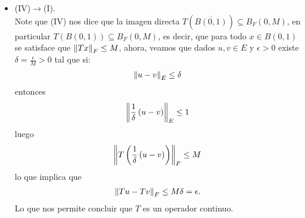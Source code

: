 \begin{homeworkProblem}
\begin{solution}
\begin{itemize}
      \item (IV)$\to$(I).\\
        Note que (IV) nos dice que la imagen directa $T\left( \overline{B(0,1)} \right)\subseteq B_{F}(0,M)$, en particular $T\left( B(0,1) \right)\subseteq B_{F}(0,M)$, es decir, que para todo $x\in B(0,1)$ se satisface que $\left\|Tx\right\|_{F}\leq M$, ahora, veamos que dados $u,v\in E$ y $\epsilon>0$ existe $\delta=\frac{\epsilon}{M}>0$ tal que si:
        \begin{align*}
          \left\|u-v\right\|_{E}\leq\delta
        \end{align*}
        entonces
        \begin{align*}
          \left\|\frac{1}{\delta}\left(u-v\right)\right\|_{E}\leq 1
        \end{align*}
        luego
        \begin{align*}
          \left\|T\left( \frac{1}{\delta}\left(u-v\right) \right)\right\|_{F}\leq M
        \end{align*}
        lo que implica que
        \begin{align*}
          \left\|Tu-Tv\right\|_{F}\leq M\delta=\epsilon.
        \end{align*}
        Lo que nos permite concluir que $T$ es un operador continuo. 
    \end{itemize}
  \end{solution}
\end{homeworkProblem}
